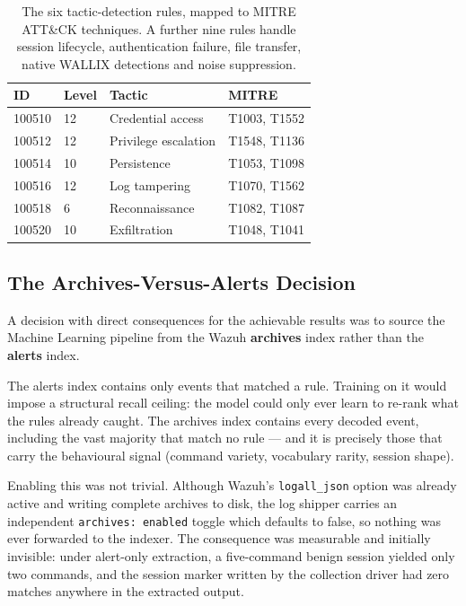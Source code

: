 \documentclass{classeENS}
\begin{document}
\begin{table}[H]
\centering
\begin{tabular}{|l|l|l|l|}
\hline
\textbf{ID} & \textbf{Level} & \textbf{Tactic} & \textbf{MITRE} \\
\hline
100510 & 12 & Credential access & T1003, T1552 \\
100512 & 12 & Privilege escalation & T1548, T1136 \\
100514 & 10 & Persistence & T1053, T1098 \\
100516 & 12 & Log tampering & T1070, T1562 \\
100518 & 6 & Reconnaissance & T1082, T1087 \\
100520 & 10 & Exfiltration & T1048, T1041 \\
\hline
\end{tabular}
\caption{The six tactic-detection rules, mapped to MITRE ATT\&CK techniques. A further nine rules handle session lifecycle, authentication failure, file transfer, native WALLIX detections and noise suppression.}
\label{tab:rules}
\end{table}

\subsection{The Archives-Versus-Alerts Decision}
\label{sec:archives}
A decision with direct consequences for the achievable results was to source the Machine Learning pipeline from the Wazuh \textbf{archives} index rather than the \textbf{alerts} index.

The alerts index contains only events that matched a rule. Training on it would impose a structural recall ceiling: the model could only ever learn to re-rank what the rules already caught. The archives index contains every decoded event, including the vast majority that match no rule --- and it is precisely those that carry the behavioural signal (command variety, vocabulary rarity, session shape).

Enabling this was not trivial. Although Wazuh's \texttt{logall\_json} option was already active and writing complete archives to disk, the log shipper carries an independent \texttt{archives: enabled} toggle which defaults to false, so nothing was ever forwarded to the indexer. The consequence was measurable and initially invisible: under alert-only extraction, a five-command benign session yielded only two commands, and the session marker written by the collection driver had zero matches anywhere in the extracted output.
\end{document}
